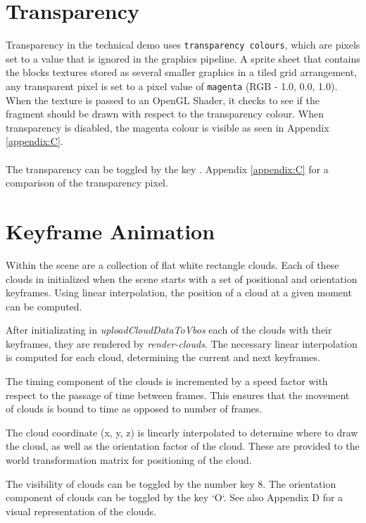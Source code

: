 \documentclass{book}
\begin{document}
\section{Transparency}
Transparency in the technical demo uses \texttt{transparency colours}, which are pixels set to a value that is ignored in the graphics pipeline.  A sprite sheet that contains the blocks textures stored as several smaller graphics in a tiled grid arrangement, any transparent pixel is set to a pixel value of \texttt{magenta} (RGB - 1.0, 0.0, 1.0).  When the texture is passed to an OpenGL Shader, it checks to see if the fragment should be drawn with respect to the transparency colour.  When transparency is disabled, the magenta colour is visible as seen in Appendix \ref{appendix:C}.
\\\\
The transparency can be toggled by the key .  Appendix \ref{appendix:C} for a comparison of the transparency pixel.
    
\section{Keyframe Animation}
    
Within the scene are a collection of flat white rectangle clouds.  Each of these clouds in initialized when the scene starts with a set of positional and orientation keyframes.  Using linear interpolation, the position of a cloud at a given moment can be computed.
    
After initializating in \textit{uploadCloudDataToVbos} each of the clouds with their keyframes, they are rendered by \textit{render-clouds}.  The necessary linear interpolation is computed for each cloud, determining the current and next keyframes.
    
The timing component of the clouds is incremented by a speed factor with respect to the passage of time between frames.  This ensures that the movement of clouds is bound to time as opposed to number of frames.  
    
The cloud coordinate (x, y, z) is linearly interpolated to determine where to draw the cloud, as well as the orientation factor of the cloud.  These are provided to the world transformation matrix for positioning of the cloud.
    
The visibility of clouds can be toggled by the number key 8.  The orientation component of clouds can be toggled by the key `O`.  See also Appendix D for a visual representation of the clouds.
    
\end{document}

